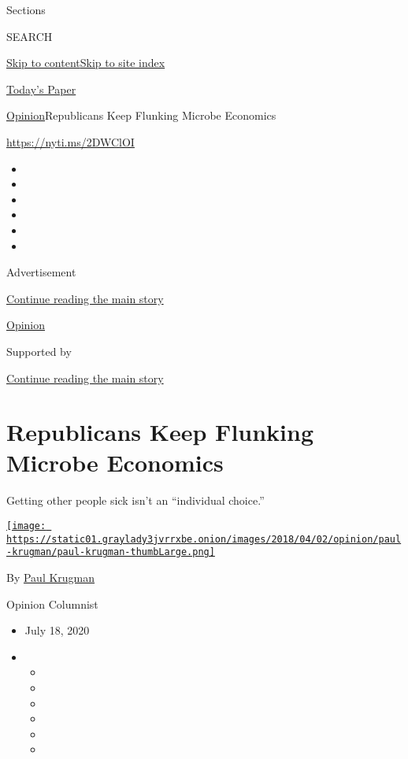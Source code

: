 Sections

SEARCH

\protect\hyperlink{site-content}{Skip to
content}\protect\hyperlink{site-index}{Skip to site index}

\href{https://myaccount.nytimes3xbfgragh.onion/auth/login?response_type=cookie\&client_id=vi}{}

\href{https://www.nytimes3xbfgragh.onion/section/todayspaper}{Today's
Paper}

\href{/section/opinion}{Opinion}\textbar{}Republicans Keep Flunking
Microbe Economics

\url{https://nyti.ms/2DWClOI}

\begin{itemize}
\item
\item
\item
\item
\item
\item
\end{itemize}

Advertisement

\protect\hyperlink{after-top}{Continue reading the main story}

\href{/section/opinion}{Opinion}

Supported by

\protect\hyperlink{after-sponsor}{Continue reading the main story}

\hypertarget{republicans-keep-flunking-microbe-economics}{%
\section{Republicans Keep Flunking Microbe
Economics}\label{republicans-keep-flunking-microbe-economics}}

Getting other people sick isn't an ``individual choice.''

\href{https://www.nytimes3xbfgragh.onion/by/paul-krugman}{\texttt{[image: https://static01.graylady3jvrrxbe.onion/images/2018/04/02/opinion/paul-krugman/paul-krugman-thumbLarge.png]}}

By \href{https://www.nytimes3xbfgragh.onion/by/paul-krugman}{Paul
Krugman}

Opinion Columnist

\begin{itemize}
\item
  July 18, 2020
\item
  \begin{itemize}
  \item
  \item
  \item
  \item
  \item
  \item
  \end{itemize}
\end{itemize}

